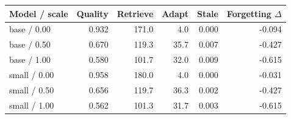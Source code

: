 \begin{tabular}{lrrrrr}
\toprule
Model / scale & Quality & Retrieve & Adapt & Stale & Forgetting $\Delta$ \\
\midrule
base / 0.00 & 0.932 & 171.0 & 4.0 & 0.000 & -0.094 \\
base / 0.50 & 0.670 & 119.3 & 35.7 & 0.007 & -0.427 \\
base / 1.00 & 0.580 & 101.7 & 32.0 & 0.009 & -0.615 \\
small / 0.00 & 0.958 & 180.0 & 4.0 & 0.000 & -0.031 \\
small / 0.50 & 0.656 & 119.7 & 36.3 & 0.002 & -0.427 \\
small / 1.00 & 0.562 & 101.3 & 31.7 & 0.003 & -0.615 \\
\bottomrule
\end{tabular}

